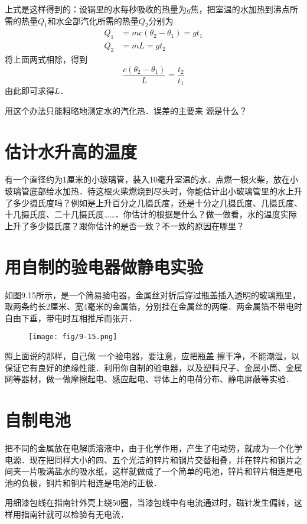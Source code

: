 上式是这样得到的：设锅里的水每秒吸收的热量为$g$焦，把室温的水加热到沸点所需的热量$Q_1$和水全部汽化所需的热量$Q_2$分别为
\[\begin{split}
    Q_1&=mc(\theta_2-\theta_1)=gt_1\\
Q_2&=mL=gt_2
\end{split}\]
将上面两式相除，得到
\[\frac{c(\theta_2-\theta_1)}{L}=\frac{t_2}{t_1}  \]
由此即可求得$L$．

用这个办法只能粗略地测定水的汽化热．误差的主要来
源是什么？

\section{估计水升高的温度}
有一个直径约为1厘米的小玻璃管，装入10毫升室温的水．点燃一根火柴，放在小玻璃管底部给水加热．待这根火柴燃烧到尽头时，你能估计出小玻璃管里的水上升了多少摄氏度吗？例如是上升百分之几摄氏度，还是十分之几摄氏度、几摄氏度、十几摄氏度、二十几摄氏度……．你估计的根据是什么？做一做看，水的温度实际上升了多少摄氏度？跟你估计的是否一致？不一致的原因在哪里？

\section{用自制的验电器做静电实验}
如图9.15所示，是一个简易验电器，金属丝对折后穿过瓶盖插入透明的玻璃瓶里，取两条约长2厘米、宽4毫米的金属箔，分别挂在金属丝的两端．两金属箔不带电时自由下垂，带电时互相推斥而张开．
\begin{figure}[htp]\centering
    \texttt{[image: fig/9-15.png]}
    \caption{}
    \end{figure}

照上面说的那样，自己做
一个验电器，要注意，应把瓶盖
擦干净，不能潮湿，以保证它有良好的绝缘性能．利用你自制的验电器，以及塑料尺子、金属小筒、金属网等器材，做一做摩擦起电、感应起电、导体上的电荷分布、静电屏蔽等实验．

\section{自制电池}
把不同的金属放在电解质溶液中，由于化学作用，产生了电动势，就成为一个化学电源．现在把同样大小的四、五个光洁的锌片和钢片交替相叠，并在锌片和钢片之间夹一片吸满盐水的吸水纸，这样就做成了一个简单的电池，锌片和锌片相连是电池的负极，铜片和铜片相连是电池的正极．

用细漆包线在指南针外壳上绕50圈，当漆包线中有电流通过时，磁针发生偏转，这样用指南针就可以检验有无电流．

